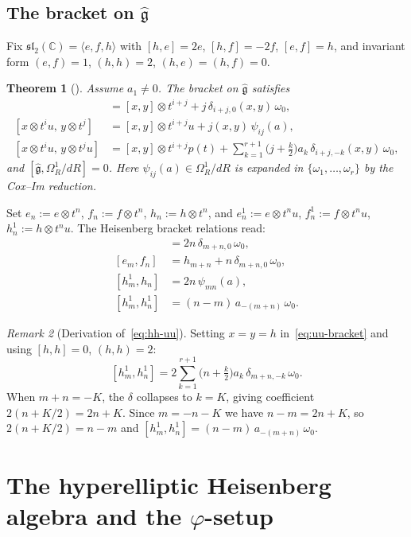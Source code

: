 \documentclass{amsart}
\newcommand{\Cx}{\mathbb{C}}
\newcommand{\g}{\mathfrak{g}}
\newcommand{\sltwo}{\mathfrak{sl}_2}
\newcommand{\wh}[1]{\widehat{#1}}
\newcommand{\whg}{\wh{\g}}
\newcommand{\la}{\langle}
\newcommand{\ra}{\rangle}
\newtheorem{theorem}{Theorem}[section]
\theoremstyle{definition}
\theoremstyle{remark}
\newtheorem{remark}[theorem]{Remark}
\numberwithin{equation}{section}
\begin{document}
\subsection{The bracket on $\whg$}
Fix $\sltwo(\Cx)=\la e,f,h\ra$ with
$[h,e]=2e$, $[h,f]=-2f$, $[e,f]=h$, and invariant form
$(e,f)=1$, $(h,h)=2$, $(h,e)=(h,f)=0$.
\begin{theorem}[{\cite[Th.~5.1]{cox2017module}}]\label{thm:cox-im-sl2}
Assume $a_1\neq0$.  The bracket on $\whg$ satisfies
\begin{align}
[x\otimes t^i,\,y\otimes t^j]
  &=[x,y]\otimes t^{i+j}+j\,\delta_{i+j,0}(x,y)\,\omega_0,
  \label{eq:tt-bracket}\\
[x\otimes t^iu,\,y\otimes t^j]
  &=[x,y]\otimes t^{i+j}u+j(x,y)\,\psi_{ij}(a),
  \label{eq:ut-bracket}\\
[x\otimes t^iu,\,y\otimes t^ju]
  &=[x,y]\otimes t^{i+j}p(t)+
    \sum_{k=1}^{r+1}\!\bigl(j+\tfrac{k}{2}\bigr)a_k\,
    \delta_{i+j,-k}(x,y)\,\omega_0,
  \label{eq:uu-bracket}
\end{align}
and $[\whg,\Omega_R^1/dR]=0$.  Here $\psi_{ij}(a)\in\Omega_R^1/dR$ is
expanded in $\{\omega_1,\dots,\omega_r\}$ by the Cox--Im reduction.
\end{theorem}
Set $e_n:=e\otimes t^n$, $f_n:=f\otimes t^n$, $h_n:=h\otimes t^n$,
and $e_n^1:=e\otimes t^nu$, $f_n^1:=f\otimes t^nu$,
$h_n^1:=h\otimes t^nu$.  The Heisenberg bracket relations read:
\begin{align}
[h_m,h_n]   &= 2n\,\delta_{m+n,0}\,\omega_0,\label{eq:hh-tt}\\
[e_m,f_n]   &= h_{m+n}+n\,\delta_{m+n,0}\,\omega_0,\label{eq:ef-tt}\\
[h_m^1,h_n] &= 2n\,\psi_{mn}(a),\label{eq:hh-ut}\\
[h_m^1,h_n^1]&=(n-m)\,a_{-(m+n)}\,\omega_0.\label{eq:hh-uu}
\end{align}
\begin{remark}[Derivation of~\eqref{eq:hh-uu}]\label{rem:derive-hh-uu}
Setting $x=y=h$ in~\eqref{eq:uu-bracket} and using $[h,h]=0$,
$(h,h)=2$:
\[
[h_m^1,h_n^1]
=2\sum_{k=1}^{r+1}\!\bigl(n+\tfrac{k}{2}\bigr)a_k\,\delta_{m+n,-k}\,\omega_0.
\]
When $m+n=-K$, the $\delta$ collapses to $k=K$, giving coefficient
$2(n+K/2)=2n+K$.  Since $m=-n-K$ we have $n-m=2n+K$, so
$2(n+K/2)=n-m$ and $[h_m^1,h_n^1]=(n-m)\,a_{-(m+n)}\,\omega_0$.
\end{remark}
\section{The hyperelliptic Heisenberg algebra and the $\varphi$-setup}
\label{sec:heisenberg}
\end{document}
